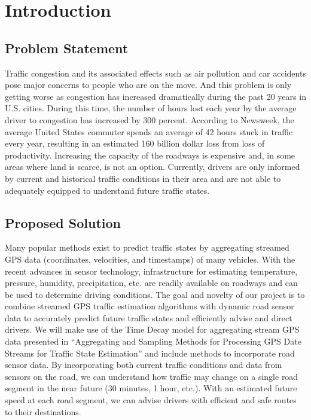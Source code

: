 \documentclass{vldb}
\begin{document}
\section{Introduction}

\subsection{Problem Statement}
Traffic congestion and its associated effects such as air pollution and car accidents pose major concerns to people who are on the move. And this problem is only getting worse as congestion has increased dramatically during the past 20 years in U.S. cities. During this time, the number of hours lost each year by the average driver to congestion has increased by 300 percent. According to Newsweek, the average United States commuter spends an average of 42 hours stuck in traffic every year, resulting in an estimated 160 billion dollar loss from loss of productivity. Increasing the capacity of the roadways is expensive and, in some areas where land is scarce, is not an option. Currently, drivers are only informed by current and historical traffic conditions in their area and are not able to adequately equipped to understand future traffic states.

\subsection{Proposed Solution}
Many popular methods exist to predict traffic states by aggregating streamed GPS data (coordinates, velocities, and timestamps) of many vehicles. With the recent advances in sensor technology, infrastructure for estimating temperature, pressure, humidity, precipitation, etc. are readily available on roadways and can be used to determine driving conditions. The goal and novelty of our project is to combine streamed GPS traffic estimation algorithms with dynamic road sensor data to accurately predict future traffic states and efficiently advise and direct drivers. We will make use of the Time Decay model for aggregating stream GPS data presented in “Aggregating and Sampling Methods for Processing GPS Date Streams for Traffic State Estimation” \cite{Zhang:TimeDecay} and include methods to incorporate road sensor data. By incorporating both current traffic conditions and data from sensors on the road, we can understand how traffic may change on a single road segment in the near future (30 minutes, 1 hour, etc.). With an estimated future speed at each road segment, we can advise drivers with efficient and safe routes to their destinations. 
\end{document}
